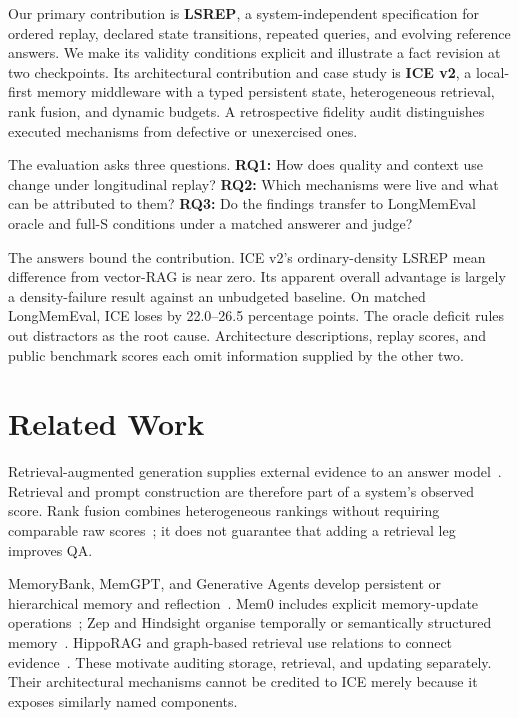 \documentclass[11pt]{article}
\begin{document}
Our primary contribution is \textbf{LSREP}, a system-independent specification for ordered replay, declared state transitions, repeated queries, and evolving reference answers. We make its validity conditions explicit and illustrate a fact revision at two checkpoints. Its architectural contribution and case study is \textbf{ICE v2}, a local-first memory middleware with a typed persistent state, heterogeneous retrieval, rank fusion, and dynamic budgets. A retrospective fidelity audit distinguishes executed mechanisms from defective or unexercised ones.

The evaluation asks three questions. \textbf{RQ1:} How does quality and context use change under longitudinal replay? \textbf{RQ2:} Which mechanisms were live and what can be attributed to them? \textbf{RQ3:} Do the findings transfer to LongMemEval oracle and full-S conditions under a matched answerer and judge?

The answers bound the contribution. ICE v2's ordinary-density LSREP mean difference from vector-RAG is near zero. Its apparent overall advantage is largely a density-failure result against an unbudgeted baseline. On matched LongMemEval, ICE loses by 22.0--26.5 percentage points. The oracle deficit rules out distractors as the root cause. Architecture descriptions, replay scores, and public benchmark scores each omit information supplied by the other two.

\section{Related Work}
Retrieval-augmented generation supplies external evidence to an answer model~\citep{lewis2020rag,guu2020realm,izacard2021fid}. Retrieval and prompt construction are therefore part of a system's observed score. Rank fusion combines heterogeneous rankings without requiring comparable raw scores~\citep{cormack2009rrf}; it does not guarantee that adding a retrieval leg improves QA.

MemoryBank, MemGPT, and Generative Agents develop persistent or hierarchical memory and reflection~\citep{zhong2024memorybank,packer2023memgpt,park2023generative}. Mem0 includes explicit memory-update operations~\citep{chhikara2025mem0}; Zep and Hindsight organise temporally or semantically structured memory~\citep{rasmussen2025zep,latimer2025hindsight}. HippoRAG and graph-based retrieval use relations to connect evidence~\citep{gutierrez2024hipporag,edge2024graphrag}. These motivate auditing storage, retrieval, and updating separately. Their architectural mechanisms cannot be credited to ICE merely because it exposes similarly named components.
\end{document}
